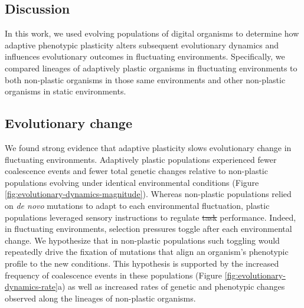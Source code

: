 \documentclass[utf8]{frontiersSCNS} %
\providecommand{\DIFaddtex}[1]{{\protect\color{blue}\uwave{#1}}} %
\providecommand{\DIFdeltex}[1]{{\protect\color{red}\sout{#1}}}                      %
\providecommand{\DIFaddbegin}{} %
\providecommand{\DIFaddend}{} %
\providecommand{\DIFdelbegin}{} %
\providecommand{\DIFdelend}{} %
\providecommand{\DIFadd}[1]{\texorpdfstring{\DIFaddtex{#1}}{#1}} %
\providecommand{\DIFdel}[1]{\texorpdfstring{\DIFdeltex{#1}}{}} %
\newcommand{\DIFscaledelfig}{0.5}
\newlength{\DIFdelgraphicswidth} %
\newlength{\DIFdelgraphicsheight} %
\newcommand{\DIFaddincludegraphics}[2][]{{\color{blue}\fbox{\DIFOincludegraphics[#1]{#2}}}} %
\newcommand{\DIFdelincludegraphics}[2][]{%
\sbox{\DIFdelgraphicsbox}{\DIFOincludegraphics[#1]{#2}}%
\settoboxwidth{\DIFdelgraphicswidth}{\DIFdelgraphicsbox} %
\settoboxtotalheight{\DIFdelgraphicsheight}{\DIFdelgraphicsbox} %
\scalebox{\DIFscaledelfig}{%
\parbox[b]{\DIFdelgraphicswidth}{\usebox{\DIFdelgraphicsbox}\\[-\baselineskip] \rule{\DIFdelgraphicswidth}{0em}}\llap{\resizebox{\DIFdelgraphicswidth}{\DIFdelgraphicsheight}{%
\setlength{\unitlength}{\DIFdelgraphicswidth}%
\begin{picture}(1,1)%
\thicklines\linethickness{2pt} %
{\color[rgb]{1,0,0}\put(0,0){\framebox(1,1){}}}%
{\color[rgb]{1,0,0}\put(0,0){\line( 1,1){1}}}%
{\color[rgb]{1,0,0}\put(0,1){\line(1,-1){1}}}%
\end{picture}%
}\hspace*{3pt}}} %
} %
\DeclareRobustCommand{\DIFaddbegin}{\DIFOaddbegin \let\includegraphics\DIFaddincludegraphics} %
\DeclareRobustCommand{\DIFaddend}{\DIFOaddend \let\includegraphics\DIFOincludegraphics} %
\DeclareRobustCommand{\DIFdelbegin}{\DIFOdelbegin \let\includegraphics\DIFdelincludegraphics} %
\DeclareRobustCommand{\DIFdelend}{\DIFOaddend \let\includegraphics\DIFOincludegraphics} %
\begin{document}
\begin{raggedbottom}

\section{Discussion}

In this work, we used evolving populations of digital organisms to determine how adaptive phenotypic plasticity alters subsequent evolutionary dynamics and influences evolutionary outcomes in fluctuating environments.
Specifically, we compared lineages of adaptively plastic organisms in fluctuating environments to both non-plastic organisms in those same environments and other non-plastic organisms in static environments.

\subsection{Evolutionary change}

We found strong evidence that adaptive plasticity slows evolutionary change in fluctuating environments.
Adaptively plastic populations experienced fewer coalescence events and fewer total genetic changes relative to non-plastic populations evolving under identical environmental conditions (Figure \ref{fig:evolutionary-dynamics-magnitude}).
Whereas non-plastic populations relied on \textit{de novo} mutations to adapt to each environmental fluctuation, plastic populations leveraged sensory instructions to regulate \DIFdelbegin \DIFdel{task }\DIFdelend \DIFaddbegin \DIFadd{function }\DIFaddend performance.
Indeed, in fluctuating environments, selection pressures toggle after each environmental change.
We hypothesize that in non-plastic populations such toggling would repeatedly drive the fixation of mutations that align an organism's phenotypic profile to the new conditions.
This hypothesis is supported by the increased frequency of coalescence events in these populations (Figure \ref{fig:evolutionary-dynamics-rate}a) as well as increased rates of genetic and phenotypic changes observed along the lineages of non-plastic organisms.


\end{raggedbottom}
\end{document}
